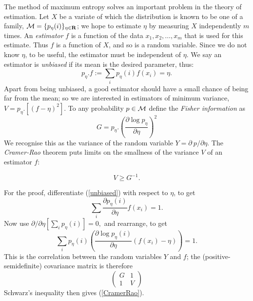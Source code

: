 The method of maximum entropy solves an important problem in the theory of
estimation. Let $X$ be a variate of which the distribution is known
to be one of a family, ${\cal M}=\{p_\eta(i)\}_{\eta\in{\bf R}}$;
we hope to estimate
$\eta$ by measuring $X$ independently $m$ times. An {\em estimator}
$f$ is a function of the data $x_1,x_2,\ldots,x_m$
that is used for this estimate.
Thus $f$ is a function of $X$, and so is a random variable.
Since we do not know $\eta$, to be useful,
the estimator must be independent of $\eta$. We say an estimator is {\em
unbiased} if its mean is the desired parameter, thus:
\begin{equation}
p_\eta.f:=\sum_ip_\eta(i)f(x_i)=\eta.
\label{unbiased}
\end{equation}
Apart from being unbiased, a good estimator should have a small chance
of being far from the mean; so we are interested in estimators of
minimum variance, $V=p_\eta.[(f-\eta)^2]$.
To any probability $p\in{\cal M}$ define the
{\em Fisher information} as \cite{Rao,Fisher}
\begin{equation}
G=p_\eta.\left(\frac{\partial\log p_\eta}{\partial\eta}\right)^2
\label{Fisher}
\end{equation}
We recognise this as the variance of the random variable $Y=\partial\
p/\partial\eta$.
The {\em Cramer-Rao} theorem puts limits on the smallness
of the variance $V$ of an estimator $f$: 
\begin{theorem}
\begin{equation}
V\geq G^{-1}.
\label{CramerRao}
\end{equation}
\end{theorem}
For the proof, differentiate (\ref{unbiased}) with respect to $\eta$,
to get
\[\sum_i\frac{\partial p_\eta(i)}{\partial \eta}f(x_i)=1.\]
Now use $\partial/\partial\eta[\sum_ip_\eta(i)]=0,$ and rearrange, to get
\begin{equation}
\sum_ip_\eta(i)\left(\frac{\partial\log p_\eta(i)}{\partial\eta}
(f(x_i)-\eta)\right)=1.
\label{Schwarz}
\end{equation}
This is the correlation between the random variables $Y$ and $f$;
the (positive-semidefinite) covariance matrix is therefore
\begin{equation}
\left(\begin{array}{cc}
      G&1\\
      1&V
\end{array}\right)
\end{equation}
Schwarz's inequality then gives (\ref{CramerRao}).

